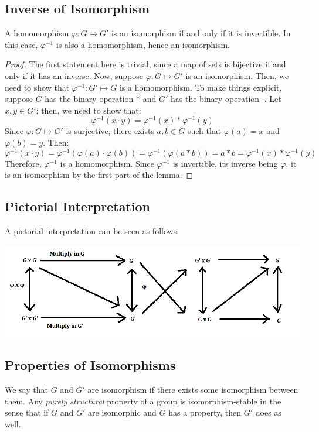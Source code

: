 \documentclass[letterpaper]{article}
\begin{document}
\subsection{Inverse of Isomorphism}
\begin{lemma}{}{}
    A homomorphism $\varphi: G \mapsto G'$ is an isomorphism if and only if it is invertible. In this case, $\varphi^{-1}$ is also a homomorphism, hence an isomorphism.
\end{lemma}
\begin{mdframed}
    \begin{proof}
        The first statement here is trivial, since a map of sets is bijective if and only if it has an inverse. Now, suppose $\varphi: G \mapsto G'$ is an isomorphism. Then, we need to show that $\varphi^{-1}: G' \mapsto G$ is a homomorphism. To make things explicit, suppose $G$ has the binary operation $*$ and $G'$ has the binary operation $\cdot$. Let $x, y \in G'$; then, we need to show that: 
        \[\varphi^{-1}(x \cdot y) = \varphi^{-1}(x) * \varphi^{-1}(y)\]
        Since $\varphi: G \mapsto G'$ is surjective, there exists $a, b \in G$ such that $\varphi(a) = x$ and $\varphi(b) = y$. Then: 
        \[\varphi^{-1}(x \cdot y) = \varphi^{-1}(\varphi(a) \cdot \varphi(b)) = \varphi^{-1}(\varphi(a * b)) = a * b = \varphi^{-1}(x) * \varphi^{-1}(y)\]
        Therefore, $\varphi^{-1}$ is a homomorphism. Since $\varphi^{-1}$ is invertible, its inverse being $\varphi$, it is an isomorphism by the first part of the lemma. 
    \end{proof}
\end{mdframed}

\subsection{Pictorial Interpretation}
A pictorial interpretation can be seen as follows: 
\begin{center}
    \includegraphics[scale=0.6]{assets/iso_diagram.png}
\end{center}

\subsection{Properties of Isomorphisms}
We say that $G$ and $G'$ are isomorphism if there exists some isomorphism between them. Any \emph{purely structural} property of a group is isomorphism-stable in the sense that if $G$ and $G'$ are isomorphic and $G$ has a property, then $G'$ does as well. 
\end{document}
